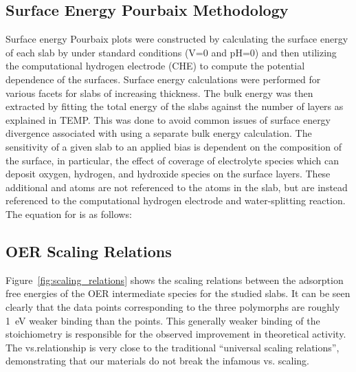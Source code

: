 \subsection{Surface Energy Pourbaix Methodology}  %
%
%
Surface energy Pourbaix plots were constructed by calculating the surface energy of each slab by under standard conditions (\si{\volt}\num{=0} and pH\num{=0}) and then utilizing the computational hydrogen electrode (CHE) to compute the potential dependence of the surfaces.
%
Surface energy calculations were performed for various facets for slabs of increasing thickness.
%
The bulk energy was then extracted by fitting the total energy of the slabs against the number of layers as explained in TEMP.
%
This was  done to avoid common issues of surface energy divergence associated with using a separate bulk energy calculation.
%
The sensitivity of a given slab to an applied bias is dependent on the composition of the surface,
in particular, the effect of coverage of electrolyte species which can deposit oxygen, hydrogen, and hydroxide species on the surface layers.
%
These additional  and  atoms are not referenced to the atoms in the slab, but are instead referenced to the computational hydrogen electrode and water-splitting reaction.
%
The equation for is as follows:


\subsection{OER Scaling Relations}  %
%

%
Figure~\ref{fig:scaling_relations} shows the scaling relations between the adsorption free energies of the OER intermediate species for the studied \IrOx slabs.
%
It can be seen clearly that the data points corresponding to the three \IrOthree polymorphs are roughly \SI{1}{\electronvolt} weaker binding than the \rIrOtwo points.
%
This generally weaker binding of the \IrOthree stoichiometry is responsible for the observed improvement in theoretical activity.
%
The \DGOOH vs.\DGOH relationship is very close to the traditional ``universal scaling relations'', demonstrating that our materials do not break the infamous \DGOOH vs. \DGOH scaling.


